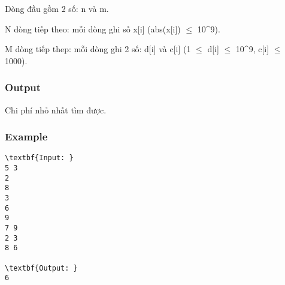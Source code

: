 Dòng đầu gồm 2 số: n và m.

N dòng tiếp theo: mỗi dòng ghi số x[i] (abs(x[i])  $\le$  10^9).

M dòng tiếp thep: mỗi dòng ghi 2 số: d[i] và c[i] (1  $\le$  d[i]  $\le$  10^9, c[i]  $\le$  1000).

\subsubsection{\textbf{Output }}

Chi phí nhỏ nhất tìm được.

\subsubsection{Example}
\begin{verbatim}
\textbf{Input: }
5 3
2
8
3
6
9
7 9
2 3
8 6

\textbf{Output: }
6\end{verbatim}
